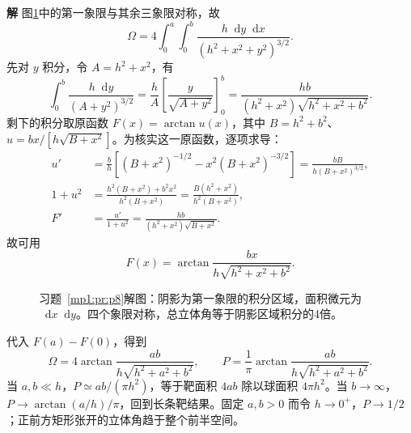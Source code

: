 \documentclass[11pt,openany,fontset=fandol]{ctexbook}
\theoremstyle{definition}\newtheorem{example}{例}[chapter]\newtheorem{exercise}{习题}[chapter]
\newcommand{\SolutionStart}{\par\medskip\ifdim\pagetotal>0pt\ifdim\dimexpr\pagegoal-\pagetotal\relax<3\baselineskip\newpage\fi\fi\noindent\textbf{解}\quad\ignorespaces}
\newenvironment{solution}{\SolutionStart}{\par\medskip}
\newcommand{\dd}{\mathop{}\!\mathrm d}\newcommand{\ee}{\mathrm e}\newcommand{\vct}[1]{\bm{#1}}
\begin{document}
\begin{solution}
图\ref{mp1:fig:p8-s}中的第一象限与其余三象限对称，故
\[
\Omega=4\int_0^a\int_0^b\frac{h\dd y\dd x}{(h^2+x^2+y^2)^{3/2}}.
\]
先对 $y$ 积分，令 $A=h^2+x^2$，有
\[
\int_0^b\frac{h\dd y}{(A+y^2)^{3/2}}
=\frac hA\left[\frac y{\sqrt{A+y^2}}\right]_0^b
=\frac{hb}{(h^2+x^2)\sqrt{h^2+x^2+b^2}}.
\]
剩下的积分取原函数 $F(x)=\arctan u(x)$，其中 $B=h^2+b^2$、$u=bx/[h\sqrt{B+x^2}]$。为核实这一原函数，逐项求导：
\[
\begin{aligned}
u'&=\frac bh\left[(B+x^2)^{-1/2}-x^2(B+x^2)^{-3/2}\right]
=\frac{bB}{h(B+x^2)^{3/2}},\\
1+u^2&=\frac{h^2(B+x^2)+b^2x^2}{h^2(B+x^2)}
=\frac{B(h^2+x^2)}{h^2(B+x^2)},\\
F'&=\frac{u'}{1+u^2}
=\frac{hb}{(h^2+x^2)\sqrt{B+x^2}}.
\end{aligned}
\]
故可用
\[
F(x)=\arctan\frac{bx}{h\sqrt{h^2+x^2+b^2}}.
\]

\begin{figure}[H]\centering

\caption{习题~\ref{mp1:pr:p8}解图：阴影为第一象限的积分区域，面积微元为 $\dd x\dd y$。四个象限对称，总立体角等于阴影区域积分的4倍。}\label{mp1:fig:p8-s}
\end{figure}

代入 $F(a)-F(0)$，得到
\[
\Omega=4\arctan\frac{ab}{h\sqrt{h^2+a^2+b^2}},\qquad
P=\frac1\pi\arctan\frac{ab}{h\sqrt{h^2+a^2+b^2}}.
\]
当 $a,b\ll h$，$P\simeq ab/(\pi h^2)$，等于靶面积 $4ab$ 除以球面积 $4\pi h^2$。当 $b\to\infty$，$P\to\arctan(a/h)/\pi$，回到长条靶结果。固定 $a,b>0$ 而令 $h\to0^+$，$P\to1/2$；正前方矩形张开的立体角趋于整个前半空间。
\end{solution}
\end{document}

